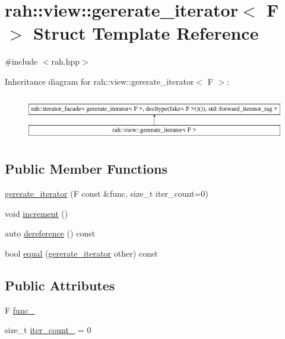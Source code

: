 \hypertarget{structrah_1_1view_1_1gererate__iterator}{}\section{rah\+::view\+::gererate\+\_\+iterator$<$ F $>$ Struct Template Reference}
\label{structrah_1_1view_1_1gererate__iterator}


{\ttfamily \#include $<$rah.\+hpp$>$}

Inheritance diagram for rah\+::view\+::gererate\+\_\+iterator$<$ F $>$\+:\begin{figure}[H]
\begin{center}
\leavevmode
\includegraphics[height=1.982301cm]{structrah_1_1view_1_1gererate__iterator}
\end{center}
\end{figure}
\subsection*{Public Member Functions}
\begin{DoxyCompactItemize}
\item 
\mbox{\hyperlink{structrah_1_1view_1_1gererate__iterator_a4fc4cf21eac55d6ffde930c781200256}{gererate\+\_\+iterator}} (F const \&func, size\+\_\+t iter\+\_\+count=0)
\item 
void \mbox{\hyperlink{structrah_1_1view_1_1gererate__iterator_a824eb3cf8ec847d7306559bcf7efc2b5}{increment}} ()
\item 
auto \mbox{\hyperlink{structrah_1_1view_1_1gererate__iterator_abc6f805627089f90408143d73d2f4227}{dereference}} () const
\item 
bool \mbox{\hyperlink{structrah_1_1view_1_1gererate__iterator_ae41007b9e3f9997ac95f011b38a0d5d2}{equal}} (\mbox{\hyperlink{structrah_1_1view_1_1gererate__iterator}{gererate\+\_\+iterator}} other) const
\end{DoxyCompactItemize}
\subsection*{Public Attributes}
\begin{DoxyCompactItemize}
\item 
F \mbox{\hyperlink{structrah_1_1view_1_1gererate__iterator_a990cec2a833b541afcaaf062443656e6}{func\+\_\+}}
\item 
size\+\_\+t \mbox{\hyperlink{structrah_1_1view_1_1gererate__iterator_a59591e436791b5adf62e0cca9ad348a1}{iter\+\_\+count\+\_\+}} = 0
\end{DoxyCompactItemize}


